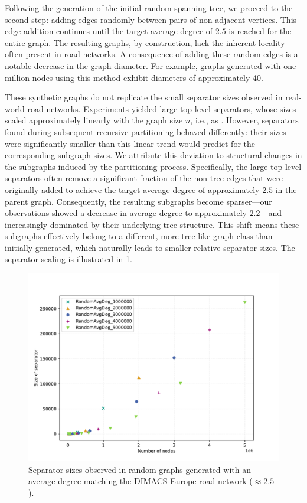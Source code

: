 Following the generation of the initial random spanning tree, we proceed to the second step: adding edges randomly between pairs of non-adjacent vertices.
This edge addition continues until the target average degree of \(2.5\) is reached for the entire graph.
The resulting graphs, by construction, lack the inherent locality often present in road networks.
A consequence of adding these random edges is a notable decrease in the graph diameter.
For example, graphs generated with one million nodes using this method exhibit diameters of approximately 40.

These synthetic graphs do not replicate the small separator sizes observed in real-world road networks.
Experiments yielded large top-level separators, whose sizes scaled approximately linearly with the graph size \(n\), i.e., as .
However, separators found during subsequent recursive partitioning behaved differently: their sizes were significantly smaller than this linear trend would predict for the corresponding subgraph sizes.
We attribute this deviation to structural changes in the subgraphs induced by the partitioning process.
Specifically, the large top-level separators often remove a significant fraction of the non-tree edges that were originally added to achieve the target average degree of approximately \(2.5\) in the parent graph.
Consequently, the resulting subgraphs become sparser—our observations showed a decrease in average degree to approximately \(2.2\)—and increasingly dominated by their underlying tree structure.
This shift means these subgraphs effectively belong to a different, more tree-like graph class than initially generated, which naturally leads to smaller relative separator sizes.
The separator scaling is illustrated in \cref{fig:same_degree}.



\begin{figure}[tbhp]
	\centering
	\includegraphics[width=0.6\linewidth]{graphics/RandomAvgDeg2.5.pdf}
	\caption{Separator sizes observed in random graphs generated with an average degree matching the DIMACS Europe road network (\( \approx 2.5 \)).}
	\label{fig:same_degree}
\end{figure}

